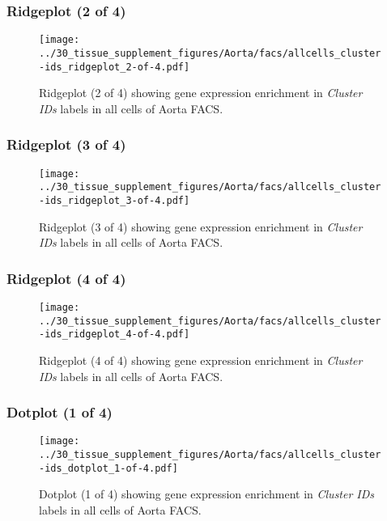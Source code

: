 \clearpage

\subsubsection{Ridgeplot (2 of 4)}
\begin{figure}[h]
\centering
\texttt{[image: ../30\_tissue\_supplement\_figures/Aorta/facs/allcells\_cluster-ids\_ridgeplot\_2-of-4.pdf]}

\caption{ Ridgeplot (2 of 4)  showing gene expression enrichment in \emph{Cluster IDs} labels in all cells of Aorta FACS. }
\end{figure}


\clearpage

\subsubsection{Ridgeplot (3 of 4)}
\begin{figure}[h]
\centering
\texttt{[image: ../30\_tissue\_supplement\_figures/Aorta/facs/allcells\_cluster-ids\_ridgeplot\_3-of-4.pdf]}

\caption{ Ridgeplot (3 of 4)  showing gene expression enrichment in \emph{Cluster IDs} labels in all cells of Aorta FACS. }
\end{figure}


\clearpage

\subsubsection{Ridgeplot (4 of 4)}
\begin{figure}[h]
\centering
\texttt{[image: ../30\_tissue\_supplement\_figures/Aorta/facs/allcells\_cluster-ids\_ridgeplot\_4-of-4.pdf]}

\caption{ Ridgeplot (4 of 4)  showing gene expression enrichment in \emph{Cluster IDs} labels in all cells of Aorta FACS. }
\end{figure}


\clearpage

\subsubsection{Dotplot (1 of 4)}
\begin{figure}[h]
\centering
\texttt{[image: ../30\_tissue\_supplement\_figures/Aorta/facs/allcells\_cluster-ids\_dotplot\_1-of-4.pdf]}

\caption{ Dotplot (1 of 4)  showing gene expression enrichment in \emph{Cluster IDs} labels in all cells of Aorta FACS. }
\end{figure}


